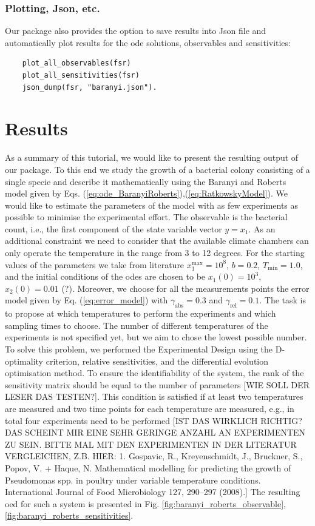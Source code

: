 \documentclass[10pt,A4paper]{article}
\begin{document}
\subsubsection*{Plotting, Json, etc.}
Our package also provides the option to save results into Json file and automatically plot results for the ode solutions, observables and sensitivities:
\begin{verbatim}
    plot_all_observables(fsr)
    plot_all_sensitivities(fsr)
    json_dump(fsr, "baranyi.json").
\end{verbatim}
%
%
%
\section*{Results}
As a summary of this tutorial, we would like to present the resulting output of our package.
To this end we study the growth of a bacterial colony consisting of a single specie and describe it mathematically using the Baranyi and Roberts model given by Eqs. (\ref{eq:ode_BaranyiRoberts}),(\ref{eq:RatkowskyModel}).
We would like to estimate the parameters of the model with as few experiments as possible to minimise the experimental effort.
The observable is the bacterial count, i.e., the first component of the state variable vector $y = x_1$.
As an additional constraint we need to consider that the available climate chambers can only operate the temperature in the range from 3 to 12 degrees.
For the starting values of the parameters we take from literature $x_1^\text{max}=10^8$, $b=0.2$, $T_\text{min}=1.0$, and the initial conditions of the \acp{ode} are chosen to be $x_1(0) = 10^3$, $x_2(0)=0.01$ \cite{}(?).
Moreover, we choose for all the measurements points the error model given by Eq. (\ref{eq:error_model}) with $\gamma_\text{abs}=0.3$ and $\gamma_\text{rel}=0.1$.
The task is to propose at which temperatures to perform the experiments and which sampling times to choose.
The number of different temperatures of the experiments is not specified yet, but we aim to chose the lowest possible number.
To solve this problem, we performed the Experimental Design using the D-optimality criterion, relative sensitivities, and the differential evolution optimisation method.
To ensure the identifiability of the system, the rank of the sensitivity matrix should be equal to the number of parameters [WIE SOLL DER LESER DAS TESTEN?].
This condition is satisfied if at least two temperatures are measured and two time points for each temperature are measured, e.g., in total four experiments need to be performed 
[IST DAS WIRKLICH RICHTIG? DAS SCHEINT MIR EINE SEHR GERINGE ANZAHL AN EXPERIMENTEN ZU SEIN. BITTE MAL MIT DEN EXPERIMENTEN IN DER LITERATUR VERGLEICHEN, Z.B. HIER: 1. Gospavic, R., Kreyenschmidt, J., Bruckner, S., Popov, V. + Haque, N. Mathematical modelling for predicting the growth of Pseudomonas spp. in poultry under variable temperature conditions. International Journal of Food Microbiology 127, 290–297 (2008).]
The resulting \ac{oed} for such a system is presented in Fig. \ref{fig:baranyi_roberts_observable}, \ref{fig:baranyi_roberts_sensitivities}.
\end{document}
